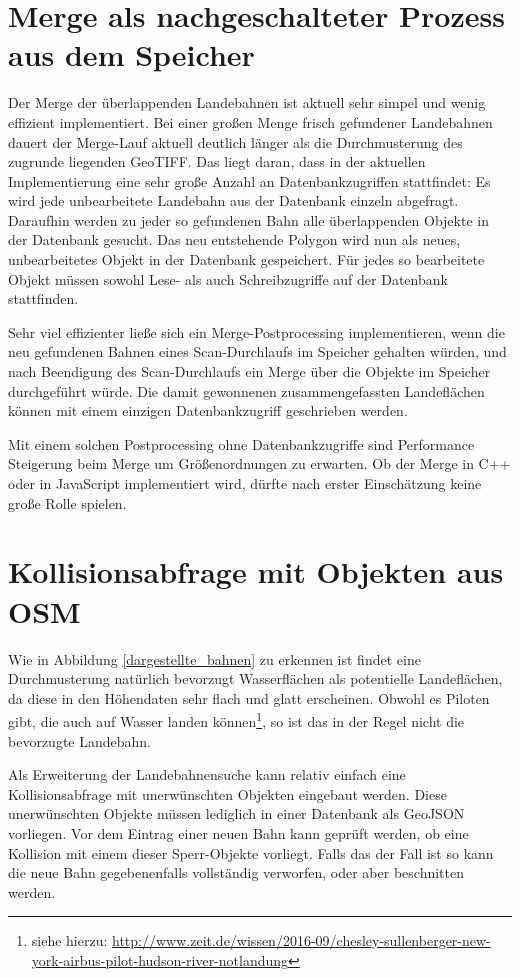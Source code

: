 \documentclass[10pt,a4paper]{report}
\begin{document}
\section{Merge als nachgeschalteter Prozess aus dem Speicher}
Der Merge der überlappenden Landebahnen ist aktuell sehr simpel und wenig effizient implementiert. Bei einer großen Menge frisch gefundener Landebahnen dauert der Merge-Lauf aktuell deutlich länger als die Durchmusterung des zugrunde liegenden GeoTIFF. Das liegt daran, dass in der aktuellen Implementierung eine sehr große Anzahl an Datenbankzugriffen stattfindet: Es wird jede unbearbeitete Landebahn aus der Datenbank einzeln abgefragt. Daraufhin werden zu jeder so gefundenen Bahn alle überlappenden Objekte in der Datenbank gesucht. Das neu entstehende Polygon wird nun als neues, unbearbeitetes Objekt in der Datenbank gespeichert. Für jedes so bearbeitete Objekt müssen sowohl Lese- als auch Schreibzugriffe auf der Datenbank stattfinden.

Sehr viel effizienter ließe sich ein Merge-Postprocessing implementieren, wenn die neu gefundenen Bahnen eines Scan-Durchlaufs im Speicher gehalten würden, und nach Beendigung des Scan-Durchlaufs ein Merge über die Objekte im Speicher durchgeführt würde. Die damit gewonnenen zusammengefassten Landeflächen können mit einem einzigen Datenbankzugriff geschrieben werden. 

Mit einem solchen Postprocessing ohne Datenbankzugriffe sind Performance Steigerung beim Merge um Größenordnungen zu erwarten.
Ob der Merge in C++ oder in JavaScript implementiert wird, dürfte nach erster Einschätzung keine große Rolle spielen.

\section{Kollisionsabfrage mit Objekten aus OSM}
Wie in Abbildung \ref{dargestellte_bahnen} zu erkennen ist findet eine Durchmusterung natürlich bevorzugt Wasserflächen als potentielle Landeflächen, da diese in den Höhendaten sehr flach und glatt erscheinen. Obwohl es Piloten gibt, die auch auf Wasser landen können\footnote{siehe hierzu: \href{http://www.zeit.de/wissen/2016-09/chesley-sullenberger-new-york-airbus-pilot-hudson-river-notlandung}{http://www.zeit.de/wissen/2016-09/chesley-sullenberger-new-york-airbus-pilot-hudson-river-notlandung}}, so ist das in der Regel nicht die bevorzugte Landebahn. 

Als Erweiterung der Landebahnensuche kann relativ einfach eine Kollisionsabfrage mit unerwünschten Objekten eingebaut werden. Diese unerwünschten Objekte müssen lediglich in einer Datenbank als GeoJSON vorliegen. Vor dem Eintrag einer neuen Bahn kann geprüft werden, ob eine Kollision mit einem dieser Sperr-Objekte vorliegt. Falls das der Fall ist so kann die neue Bahn gegebenenfalls vollständig verworfen, oder aber beschnitten werden.
\end{document}
